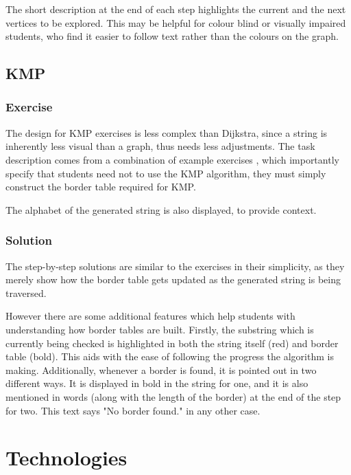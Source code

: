 \documentclass{l4proj}
\begin{document}
The short description at the end of each step highlights the current and the next vertices to be explored. This may be helpful for colour blind or visually impaired students, who find it easier to follow text rather than the colours on the graph.

\subsection{KMP}

\subsubsection{Exercise}
\label{sec:KMPExerciseDesign}

The design for KMP exercises is less complex than Dijkstra, since a string is inherently less visual than a graph, thus needs less adjustments. The task description comes from a combination of example exercises \cite{a}, which importantly specify that students need not to use the KMP algorithm, they must simply construct the border table required for KMP. 

The alphabet of the generated string is also displayed, to provide context.

\subsubsection{Solution}
\label{sec:KMPSolutionDesign}

The step-by-step solutions are similar to the exercises in their simplicity, as they merely show how the border table gets updated as the generated string is being traversed.

However there are some additional features which help students with understanding how border tables are built. Firstly, the substring which is currently being checked is highlighted in both the string itself (red) and border table (bold). This aids with the ease of following the progress the algorithm is making. Additionally, whenever a border is found, it is pointed out in two different ways. It is displayed in bold in the string for one, and it is also mentioned in words (along with the length of the border) at the end of the step for two. This text says "No border found." in any other case.

\section{Technologies}
\end{document}

